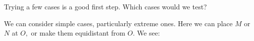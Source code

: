 







Trying a few cases is a good first step. Which cases would we test?





We can consider simple cases, particularly extreme ones. Here we can place $M$ or $N$ at $O,$ or make them equidistant from $O.$ We see:




